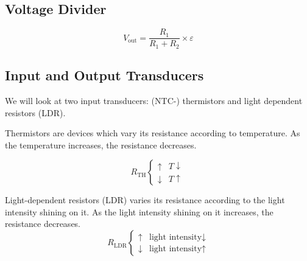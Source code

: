 \documentclass[../main.tex]{subfiles}
\begin{document}
	\subsection{Voltage Divider}
	\begin{center}
	\end{center}
	\[V_{\mathrm{out}} = \frac{R_1}{R_1 + R_2} \times \varepsilon\]
	
	\subsection{Input and Output Transducers}
	We will look at two input transducers: (NTC-) thermistors and light dependent resistors (LDR).
	
	Thermistors are devices which vary its resistance according to temperature. As the temperature increases, the resistance decreases.
	
	\[
		R_{\mathrm{TH}} \begin{cases}
			\uparrow & T \downarrow \\
			\downarrow & T \uparrow
		\end{cases}
	\]
	
	Light-dependent resistors (LDR) varies its resistance according to the light intensity shining on it. As the light intensity shining on it increases, the resistance decreases.
	\[
		R_{\mathrm{LDR}} \begin{cases}
			\uparrow & \text{light intensity} \downarrow \\
			\downarrow & \text{light intensity} \uparrow
		\end{cases}
	\]
\end{document}
